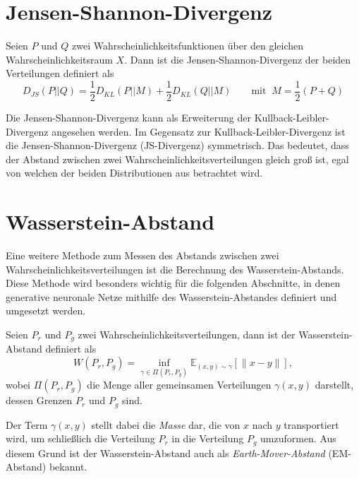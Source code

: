 \section{Jensen-Shannon-Divergenz}
\begin{definition}
Seien $P$ und $Q$ zwei Wahr\-schein\-lichkeitsfunktionen über den gleichen
Wahrscheinlichkeitsraum $X$. Dann ist die Jensen-Shannon-Divergenz der
beiden Verteilungen definiert als
\[
    D_{JS}(P \lvert\lvert Q) = \frac{1}{2} D_{KL}(P \lvert\lvert M) + \frac{1}{2} D_{KL}(Q \lvert\lvert M) \quad\quad \text{mit} \;\; M = \frac{1}{2}(P + Q)
\]
\end{definition}
Die Jensen-Shannon-Divergenz kann als Erweiterung der
Kullback-Leibler-Divergenz angesehen werden. Im Gegensatz zur
Kullback-Leibler-Divergenz ist die Jensen-Shannon-Divergenz (JS-Divergenz)
symmetrisch. Das bedeutet, dass der Abstand zwischen zwei
Wahrscheinlichkeitsverteilungen gleich groß ist, egal von welchen der beiden
Distributionen aus betrachtet wird.

\section{Wasserstein-Abstand}
Eine weitere Methode zum Messen des Abstands zwischen zwei
Wahrscheinlichkeitsverteilungen ist die Berechnung des Wasserstein-Abstands.
Diese Methode wird besonders wichtig für die folgenden Abschnitte, in denen
generative neuronale Netze mithilfe des Wasserstein-Abstandes definiert und
umgesetzt werden.

\begin{definition}
Seien $P_r$ und $P_g$ zwei Wahrscheinlichkeitsverteilungen, dann ist der
Wasserstein-Abstand definiert als
\[
    W(P_r, P_g) = \inf_{\gamma \in \Pi(P_r, P_g)} \mathbb{E}_{(x, y) \sim \gamma} \left[\|x - y\|\right],
\]
wobei $\Pi(P_r, P_g)$ die Menge aller gemeinsamen Verteilungen $\gamma(x,
y)$ darstellt, dessen Grenzen $P_r$ und $P_g$ sind.
\end{definition}

Der Term $\gamma(x, y)$ stellt dabei die \textit{Masse} dar, die von $x$ nach
$y$ transportiert wird, um schließlich die Verteilung $P_r$ in die Verteilung
$P_g$ umzuformen. Aus diesem Grund ist der Wasserstein-Abstand auch als
\textit{Earth-Mover-Abstand} (EM-Abstand) bekannt.

\FloatBarrier
